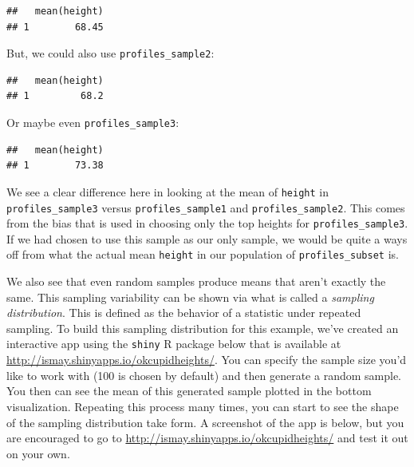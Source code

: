 \documentclass[]{tufte-book}
\newenvironment{Shaded}{\begin{snugshade}}{\end{snugshade}}
\newcommand{\KeywordTok}[1]{\textcolor[rgb]{0.13,0.29,0.53}{\textbf{{#1}}}}
\newcommand{\StringTok}[1]{\textcolor[rgb]{0.31,0.60,0.02}{{#1}}}
\newcommand{\NormalTok}[1]{{#1}}
\theoremstyle{definition}
\theoremstyle{definition}
\theoremstyle{remark}
\begin{document}
\begin{Shaded}
\end{Shaded}

\begin{verbatim}
##   mean(height)
## 1        68.45
\end{verbatim}

But, we could also use \texttt{profiles\_sample2}:

\begin{Shaded}
\end{Shaded}

\begin{verbatim}
##   mean(height)
## 1         68.2
\end{verbatim}

Or maybe even \texttt{profiles\_sample3}:

\begin{Shaded}
\end{Shaded}

\begin{verbatim}
##   mean(height)
## 1        73.38
\end{verbatim}

We see a clear difference here in looking at the mean of \texttt{height}
in \texttt{profiles\_sample3} versus \texttt{profiles\_sample1} and
\texttt{profiles\_sample2}. This comes from the bias that is used in
choosing only the top heights for \texttt{profiles\_sample3}. If we had
chosen to use this sample as our only sample, we would be quite a ways
off from what the actual mean \texttt{height} in our population of
\texttt{profiles\_subset} is.

We also see that even random samples produce means that aren't exactly
the same. This sampling variability can be shown via what is called a
\emph{sampling distribution}. This is defined as the behavior of a
statistic under repeated sampling. To build this sampling distribution
for this example, we've created an interactive app using the
\texttt{shiny} R package below that is available at
\url{http://ismay.shinyapps.io/okcupidheights/}. You can specify the
sample size you'd like to work with (100 is chosen by default) and then
generate a random sample. You then can see the mean of this generated
sample plotted in the bottom visualization. Repeating this process many
times, you can start to see the shape of the sampling distribution take
form. A screenshot of the app is below, but you are encouraged to go to
\url{http://ismay.shinyapps.io/okcupidheights/} and test it out on your
own.
\end{document}
